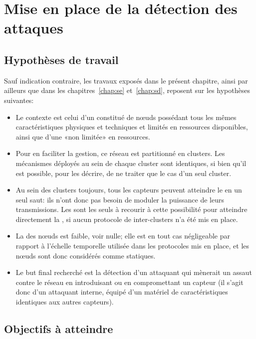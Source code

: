\section{Mise en place de la détection des attaques}
\label{sa:sec:detection}
    \subsection{Hypothèses de travail}\label{sa:ssec:hypotheses}

Sauf indication contraire, les travaux exposés dans le présent chapitre, ainsi par ailleurs que dans les chapitres~\ref{chap:se} et~\ref{chap:sd}, reposent sur les hypothèses suivantes:
\begin{itemize}
    \item Le contexte est celui d'un \rcsf constitué de nœuds possédant tous les mêmes caractéristiques physiques et techniques et limités en ressources disponibles, ainsi que d'une \sdb «non limitée» en ressources.
    \item Pour en faciliter la gestion, ce réseau est partitionné en clusters. Les mécanismes déployés au sein de chaque cluster sont identiques, si bien qu'il est possible, pour les décrire, de ne traiter que le cas d'un seul cluster.
    \item Au sein des clusters toujours, tous les capteurs peuvent atteindre le \ch en un seul saut: ils n'ont donc pas besoin de moduler la puissance de leurs transmissions. Les \chs sont les seuls à recourir à cette possibilité pour atteindre directement la \sdb, si aucun protocole de  inter-clusters n'a été mis en place.
    \item La  des nœuds est faible, voir nulle; elle est en tout cas négligeable par rapport à l'échelle temporelle utilisée dans les protocoles mis en place, et les nœuds sont donc considérés comme statiques.
    \item Le but final recherché est la détection d'un attaquant qui mènerait un assaut contre le réseau en introduisant ou en compromettant un capteur (il s'agit donc d'un attaquant interne, équipé d'un matériel de caractéristiques identiques aux autres capteurs).
\end{itemize}

    \subsection{Objectifs à atteindre}

